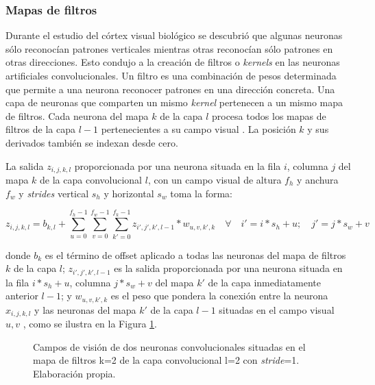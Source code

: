 \subsubsection{Mapas de filtros}
Durante el estudio del córtex visual biológico se descubrió que algunas neuronas sólo reconocían patrones verticales mientras otras reconocían sólo patrones en otras direcciones. Esto condujo a la creación de filtros o \textit{kernels} en las neuronas artificiales convolucionales. Un filtro es una combinación de pesos determinada que permite a una neurona reconocer patrones en una dirección concreta. Una capa de neuronas que comparten un mismo \textit{kernel} pertenecen a un mismo mapa de filtros. Cada neurona del mapa $k$ de la capa $l$ procesa todos los mapas de filtros de la capa $l-1$ pertenecientes a su campo visual \cite{machinelearningbook}. La posición $k$ y sus derivados también se indexan desde cero.

La salida $z_{i,j,k,l}$ proporcionada por una neurona situada en la fila $i$, columna $j$ del mapa $k$ de la capa convolucional $l$, con un campo visual de altura $f_h$ y anchura $f_w$ y \textit{strides} vertical $s_h$ y horizontal $s_w$ toma la forma:

\begin{equation}
	z_{i,j,k,l}=b_{k,l}+\sum_{u=0}^{f_h-1}\sum_{v=0}^{f_w-1}\sum_{k'=0}^{f_k-1}z_{i',j',k',l-1}*w_{u,v,k',k} \hspace{1em}\forall \hspace{1em}i'=i*s_h+u ;\hspace{1em} j'=j*s_w+v
\end{equation}

donde $b_k$ es el término de offset aplicado a todas las neuronas del mapa de filtros $k$ de la capa $l$; $z_{i',j',k',l-1}$ es la salida proporcionada por una neurona situada en la fila $i*s_h+u$, columna $j*s_w+v$ del mapa $k'$ de la capa inmediatamente anterior $l-1$; y $w_{u,v,k',k}$ es el peso que pondera la conexión entre la neurona $x_{i,j,k,l}$ y las neuronas del mapa $k'$ de la capa $l-1$ situadas en el campo visual $u,v$ \cite{machinelearningbook}, como se ilustra en la Figura \ref{fig:convneuronrecepfield}.

\begin{figure}[h!]
	\centering
	
	\caption{Campos de visión de dos neuronas convolucionales situadas en el mapa de filtros k=2 de la capa convolucional l=2 con \textit{stride}=1. Elaboración propia.}
	\label{fig:convneuronrecepfield}
\end{figure}
\FloatBarrier


